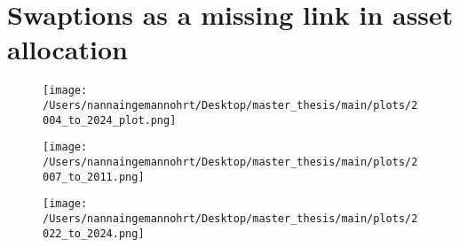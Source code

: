 \section{Swaptions as a missing link in asset allocation}

\begin{figure}[H]
    \centering
    \texttt{[image: /Users/nannaingemannohrt/Desktop/master\_thesis/main/plots/2004\_to\_2024\_plot.png]}
    \caption{}
    \label{fig:2004_2024}
\end{figure}
\noindent

\begin{figure}[H]
    \centering
    \texttt{[image: /Users/nannaingemannohrt/Desktop/master\_thesis/main/plots/2007\_to\_2011.png]}
    \caption{}
    \label{fig:2007_2011}
\end{figure}
\noindent

\begin{figure}[H]
    \centering
    \texttt{[image: /Users/nannaingemannohrt/Desktop/master\_thesis/main/plots/2022\_to\_2024.png]}
    \caption{}
    \label{fig:2007_2011}
\end{figure}
\noindent

